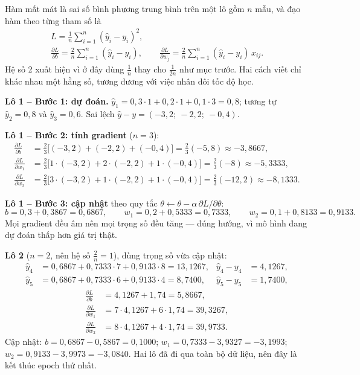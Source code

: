 Hàm mất mát là sai số bình phương trung bình trên một lô gồm $n$ mẫu, và đạo hàm theo từng tham số là
\begin{gather}
    L = \frac{1}{n}\sum_{i=1}^{n}(\hat{y}_i - y_i)^2, \\
    \frac{\partial L}{\partial b} = \frac{2}{n}\sum_{i=1}^{n}(\hat{y}_i - y_i), \qquad
    \frac{\partial L}{\partial w_j} = \frac{2}{n}\sum_{i=1}^{n}(\hat{y}_i - y_i)\,x_{ij}.
\end{gather}
Hệ số 2 xuất hiện vì ở đây dùng $\frac{1}{n}$ thay cho $\frac{1}{2n}$ như mục trước. Hai cách viết chỉ khác nhau một hằng số, tương đương với việc nhân đôi tốc độ học.

\noindent\textbf{Lô 1 -- Bước 1: dự đoán.} $\hat{y}_1 = 0{,}3 \cdot 1 + 0{,}2 \cdot 1 + 0{,}1 \cdot 3 = 0{,}8$; tương tự $\hat{y}_2 = 0{,}8$ và $\hat{y}_3 = 0{,}6$. Sai lệch $\hat{y} - y = (-3{,}2;\ -2{,}2;\ -0{,}4)$.

\noindent\textbf{Lô 1 -- Bước 2: tính gradient} ($n = 3$):
\begin{align*}
    \frac{\partial L}{\partial b} &= \tfrac{2}{3}\big[(-3{,}2) + (-2{,}2) + (-0{,}4)\big] = \tfrac{2}{3}(-5{,}8) \approx -3{,}8667,\\
    \frac{\partial L}{\partial w_1} &= \tfrac{2}{3}\big[1 \cdot (-3{,}2) + 2 \cdot (-2{,}2) + 1 \cdot (-0{,}4)\big] = \tfrac{2}{3}(-8) \approx -5{,}3333,\\
    \frac{\partial L}{\partial w_2} &= \tfrac{2}{3}\big[3 \cdot (-3{,}2) + 1 \cdot (-2{,}2) + 1 \cdot (-0{,}4)\big] = \tfrac{2}{3}(-12{,}2) \approx -8{,}1333.
\end{align*}

\noindent\textbf{Lô 1 -- Bước 3: cập nhật} theo quy tắc $\theta \leftarrow \theta - \alpha\,\partial L/\partial\theta$:
\[
    b = 0{,}3 + 0{,}3867 = 0{,}6867, \qquad
    w_1 = 0{,}2 + 0{,}5333 = 0{,}7333, \qquad
    w_2 = 0{,}1 + 0{,}8133 = 0{,}9133.
\]
Mọi gradient đều âm nên mọi trọng số đều tăng --- đúng hướng, vì mô hình đang dự đoán thấp hơn giá trị thật.

\noindent\textbf{Lô 2} ($n = 2$, nên hệ số $\frac{2}{n} = 1$), dùng trọng số vừa cập nhật:
\begin{align*}
    \hat{y}_4 &= 0{,}6867 + 0{,}7333 \cdot 7 + 0{,}9133 \cdot 8 = 13{,}1267, & \hat{y}_4 - y_4 &= 4{,}1267,\\
    \hat{y}_5 &= 0{,}6867 + 0{,}7333 \cdot 6 + 0{,}9133 \cdot 4 = 8{,}7400, & \hat{y}_5 - y_5 &= 1{,}7400,
\end{align*}
\begin{align*}
    \frac{\partial L}{\partial b} &= 4{,}1267 + 1{,}74 = 5{,}8667,\\
    \frac{\partial L}{\partial w_1} &= 7 \cdot 4{,}1267 + 6 \cdot 1{,}74 = 39{,}3267,\\
    \frac{\partial L}{\partial w_2} &= 8 \cdot 4{,}1267 + 4 \cdot 1{,}74 = 39{,}9733.
\end{align*}
Cập nhật: $b = 0{,}6867 - 0{,}5867 = 0{,}1000$; $w_1 = 0{,}7333 - 3{,}9327 = -3{,}1993$; $w_2 = 0{,}9133 - 3{,}9973 = -3{,}0840$. Hai lô đã đi qua toàn bộ dữ liệu, nên đây là kết thúc epoch thứ nhất.

